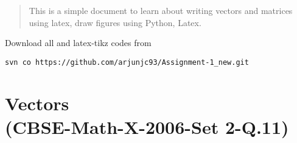 \documentclass[journal,12pt,twocolumn]{IEEEtran}
\begin{document}
\newpage
\bigskip
\renewcommand{\thefigure}{\theenumi}
\renewcommand{\thetable}{\theenumi}
\begin{abstract}
This is a simple document to learn about writing vectors and matrices using latex, draw figures using Python, Latex.
\end{abstract}
%
Download all and latex-tikz codes from 
%
\begin{lstlisting}
svn co https://github.com/arjunjc93/Assignment-1_new.git
\end{lstlisting}
%
\section{Vectors\\(CBSE-Math-X-2006-Set 2-Q.11)}
\renewcommand{\theequation}{\theenumi}
\end{document}
